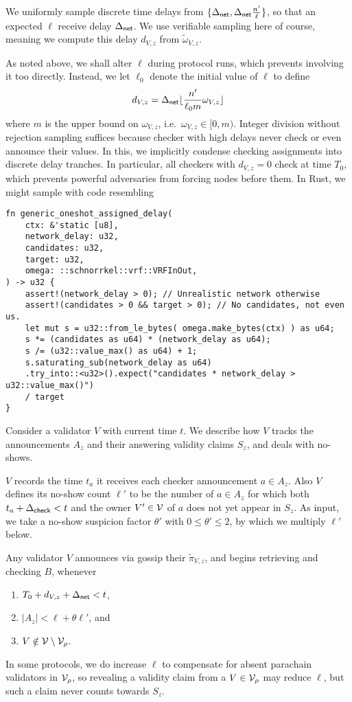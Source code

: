 We uniformly sample discrete time delays from $\{ \Delta_{\mathsf{net}}, \Delta_{\mathsf{net}} {n' \over \ell} \}$, so that an expected $\ell$ receive delay $\Delta_{\mathsf{net}}$.  We use verifiable sampling here of course, meaning we compute this delay $d_{V,z}$ from $\tilde{\omega}_{V,z}$.  

As noted above, we shall alter $\ell$ during protocol runs, which prevents involving it too directly.  Instead, we let $\ell_0$ denote the initial value of $\ell$ to define 
$$ d_{V,z} = \Delta_{\mathsf{net}} \lfloor {n' \over \ell_0 m} \omega_{V,z} \rfloor $$
where $m$ is the upper bound on $\omega_{V,z}$, i.e.\ $\omega_{V,z} \in [0,m)$.  Integer division without rejection sampling suffices because checker with high delays never check or even announce their values.
%
In this, we implicitly condense checking assignments into discrete delay tranches.  In particular, all checkers with $d_{V,z} = 0$ check at time $T_0$, which prevents powerful adversaries from forcing nodes before them. 
%
In Rust, we might sample with code resembling
\begin{verbatim}
fn generic_oneshot_assigned_delay(
    ctx: &'static [u8],
    network_delay: u32, 
    candidates: u32,
    target: u32,
    omega: ::schnorrkel::vrf::VRFInOut,
) -> u32 {
    assert!(network_delay > 0); // Unrealistic network otherwise
    assert!(candidates > 0 && target > 0); // No candidates, not even us.
    let mut s = u32::from_le_bytes( omega.make_bytes(ctx) ) as u64;
    s *= (candidates as u64) * (network_delay as u64);
    s /= (u32::value_max() as u64) + 1;
    s.saturating_sub(network_delay as u64)
    .try_into::<u32>().expect("candidates * network_delay > u32::value_max()")
    / target
}
\end{verbatim}

Consider a validator $V$ with current time $t$.  We describe how $V$ tracks the announcements $A_z$ and their answering validity claims $S_z$, and deals with no-shows.

$V$ records the time $t_a$ it receives each checker announcement $a \in A_z$.  Also $V$ defines its no-show count $\ell'$ to be the number of $a \in A_z$ for which both $t_a + \Delta_{\mathsf{check}} < t$ and the owner $V'\in \mathcal{V}$ of $a$ does not yet appear in $S_z$.  As input, we take a no-show suspicion factor $\theta'$ with $0 \le \theta' \le 2$, by which we multiply $\ell'$ below.

Any validator $V$ announces via gossip their $\tilde{\pi}_{V,z}$, and begins retrieving and checking $B$, whenever
\begin{enumerate}
\item $T_0 + d_{V,z} + \Delta_{\mathsf{net}} < t$,
\item $|A_z| < \ell + \theta \ell'$, and
\item $V \notin \mathcal{V} \setminus \mathcal{V}_\rho$.
\end{enumerate}
In some protocols, we do increase $\ell$ to compensate for absent parachain validators in $\mathcal{V}_\rho$, so revealing a validity claim from a $V \in \mathcal{V}_\rho$ may reduce $\ell$, but such a claim never counts towards $S_z$.

